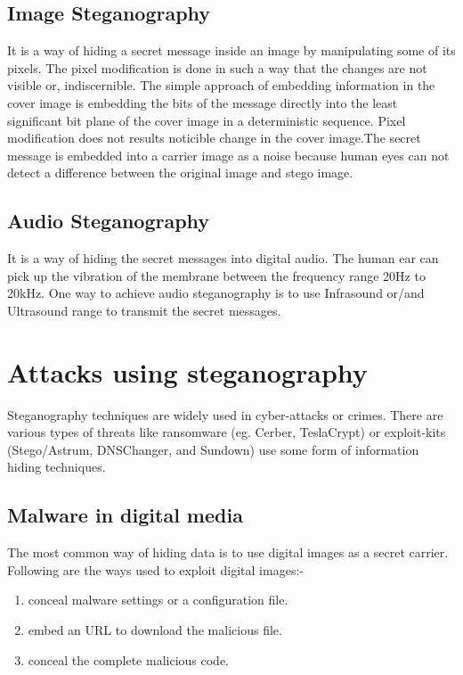 \documentclass[12ptpt,conference]{IEEEtran}
\begin{document}
\subsection{Image Steganography}
It is a way of hiding a secret message inside an image by manipulating some of its pixels. The pixel modification is done in such a way that the changes are not visible or, indiscernible.
The simple approach of embedding information in the cover image is embedding the bits of the message directly into the least significant bit plane of the cover image in a deterministic sequence. Pixel modification does not results noticible change in the cover image.The secret message is
embedded into a carrier image as a noise because human
eyes can not detect a difference between the original
image and stego image.



\subsection{Audio Steganography}
It is a way of hiding the secret messages into digital audio. The human ear can pick up the vibration of the membrane between the frequency range 20Hz to 20kHz. One way to achieve audio steganography is to use Infrasound or/and Ultrasound range to transmit the secret messages.


\section {Attacks using steganography}
\noindent Steganography techniques are widely used in cyber-attacks or crimes.
There are various types of threats like ransomware (eg. Cerber, TeslaCrypt) or exploit-kits (Stego/Astrum, DNSChanger, and Sundown) use some form of information hiding techniques.
\subsection{Malware in digital media}
\noindent The most common way of hiding data is to use digital images as a secret carrier.
\\
Following are the ways used to exploit digital  images:-
\begin{enumerate}
\item conceal malware settings or a configuration file.
\item embed an URL to download the malicious file.
\item conceal the complete malicious code.
\end{enumerate}
\end{document}
